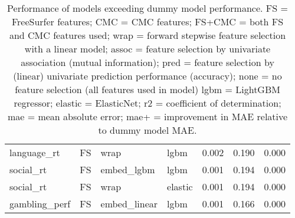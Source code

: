 \documentclass{article}
\begin{document}
\begin{table}
\begin{tabular}{llllrrr}
	language\_rt & FS & wrap & lgbm & 0.002 & 0.190 & 0.000 \\
	social\_rt & FS & embed\_lgbm & lgbm & 0.001 & 0.194 & 0.000 \\
	social\_rt & FS & wrap & elastic & 0.001 & 0.194 & 0.000 \\
	gambling\_perf & FS & embed\_linear & lgbm & 0.001 & 0.166 & 0.000 \\
	\bottomrule
\end{tabular}
\footnotesize
\caption{Performance of models exceeding dummy model performance.
FS = FreeSurfer features; CMC = CMC features; FS+CMC = both FS and CMC features used;
wrap = forward stepwise feature selection with a linear model;
assoc = feature selection by univariate association (mutual information);
pred = feature selection by (linear) univariate prediction performance (accuracy);
none = no feature selection (all features used in model)
lgbm = LightGBM regressor; elastic = ElasticNet;
r2 = coefficient of determination; mae = mean absolute error;
mae+ = improvement in MAE relative to dummy model MAE.}
\normalsize
\label{tab:cmc-p-model-predictive}
\end{table}

\end{document}

